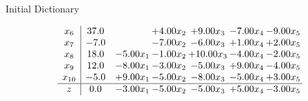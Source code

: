 \documentclass[8pt]{article}
\begin{document}
Initial Dictionary 

\[\begin{array}{c| c c@{\hskip 2pt} c@{\hskip 2pt} c@{\hskip 2pt} c@{\hskip 2pt} c@{\hskip 2pt} }
 x_{6}   &  37.0  &   & +  4.00 x_{2} & +  9.00 x_{3} & -7.00 x_{4} & -9.00 x_{5}\\
 x_{7}   &  -7.0  &   & -7.00 x_{2} & -6.00 x_{3} & +  1.00 x_{4} & +  2.00 x_{5}\\
 x_{8}   &  18.0 & -5.00 x_{1} & -1.00 x_{2} & + 10.00 x_{3} & -4.00 x_{4} & -2.00 x_{5}\\
 x_{9}   &  12.0 & -8.00 x_{1} & -3.00 x_{2} & -5.00 x_{3} & +  9.00 x_{4} & -4.00 x_{5}\\
 x_{10}   &  -5.0 & +  9.00 x_{1} & -5.00 x_{2} & -8.00 x_{3} & -5.00 x_{4} & +  3.00 x_{5}\\
\hline
z    &  0.0 & -3.00 x_{1} & -5.00 x_{2} & -5.00 x_{3} & +  5.00 x_{4} & -3.00 x_{5}\\
\end{array}\]
\end{document}

